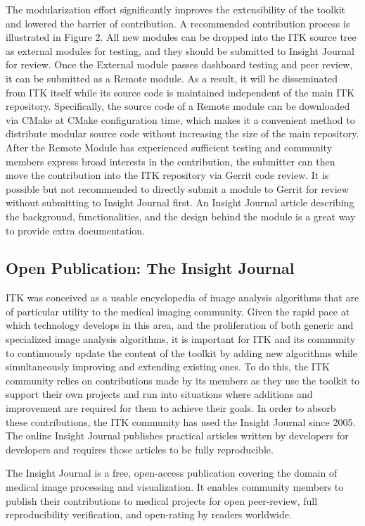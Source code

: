 \documentclass{frontiersENG} %
\begin{document}
The modularization effort significantly improves the extensibility of the
toolkit and lowered the barrier of contribution. A recommended contribution
process is illustrated in Figure 2.  All new modules can be dropped
into the ITK source tree as external modules for testing, and they should be
submitted to Insight Journal for review. Once the External module passes
dashboard testing and peer review, it can be submitted as a Remote module. As
a result, it will be disseminated from ITK itself while its source code is
maintained independent of the main ITK repository. Specifically, the source
code of a Remote module can be downloaded via CMake at CMake configuration
time, which makes it a convenient method to distribute modular source code
without increasing the size of the main repository. After the Remote Module
has experienced sufficient testing and community members express broad
interests in the contribution, the submitter can then move the contribution
into the ITK repository via Gerrit code review.  It is possible but not
recommended to directly submit a module to Gerrit for review without
submitting to Insight Journal first. An Insight Journal article describing the
background, functionalities, and the design behind the module is a great way
to provide extra documentation.


\subsection{Open Publication: The Insight Journal}
ITK was conceived as a usable encyclopedia of image analysis algorithms
that are of particular utility to the medical imaging community. Given the
rapid pace at which technology develops in this area, and the proliferation of
both generic and specialized image analysis algorithms, it is important for ITK
and its community to continuously update the content of the toolkit by adding
new algorithms while simultaneously improving and extending existing ones. To
do this, the ITK community relies on contributions made by its members as they
use the toolkit to support their own projects and run into situations where
additions and improvement are required for them to achieve their goals. In
order to absorb these contributions, the ITK community has used the Insight
Journal \cite{InsightJournal} since 2005. The online Insight Journal
publishes practical articles written by developers for developers and requires
those articles to be fully reproducible.

The Insight Journal is a free, open-access publication covering the domain of
medical image processing and visualization. It enables community members to
publish their contributions to medical projects for open peer-review, full
reproducibility verification, and open-rating by readers worldwide.
\end{document}
